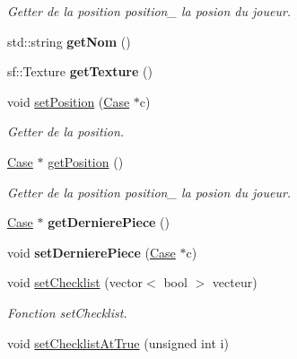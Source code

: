 \begin{DoxyCompactItemize}
\begin{DoxyCompactList}\small\item\em \-Getter de la position  position\-\_\- la posion du joueur. \end{DoxyCompactList}\item 
\hypertarget{classJoueur_a5ba8036208a35efd6bf37a86b36063b0}{std\-::string {\bfseries get\-Nom} ()}\label{classJoueur_a5ba8036208a35efd6bf37a86b36063b0}

\item 
\hypertarget{classJoueur_a04ffca29cd433b795e248eae8b04d2c1}{sf\-::\-Texture {\bfseries get\-Texture} ()}\label{classJoueur_a04ffca29cd433b795e248eae8b04d2c1}

\item 
void \hyperlink{classJoueur_aff78215b191d488c6555d100060fc2d6}{set\-Position} (\hyperlink{classCase}{\-Case} $\ast$c)
\begin{DoxyCompactList}\small\item\em \-Getter de la position. \end{DoxyCompactList}\item 
\hypertarget{classJoueur_a528cac966c6cfeab47e666ce3b2735c2}{\hyperlink{classCase}{\-Case} $\ast$ \hyperlink{classJoueur_a528cac966c6cfeab47e666ce3b2735c2}{get\-Position} ()}\label{classJoueur_a528cac966c6cfeab47e666ce3b2735c2}

\begin{DoxyCompactList}\small\item\em \-Getter de la position  position\-\_\- la posion du joueur. \end{DoxyCompactList}\item 
\hypertarget{classJoueur_a32909e93ab648b236fd670b8a24c5fb6}{\hyperlink{classCase}{\-Case} $\ast$ {\bfseries get\-Derniere\-Piece} ()}\label{classJoueur_a32909e93ab648b236fd670b8a24c5fb6}

\item 
\hypertarget{classJoueur_ace4248a785b7be8e12bcaaf84e3a41b5}{void {\bfseries set\-Derniere\-Piece} (\hyperlink{classCase}{\-Case} $\ast$c)}\label{classJoueur_ace4248a785b7be8e12bcaaf84e3a41b5}

\item 
\hypertarget{classJoueur_a5d32e5ba9665404f3b30fa5f548aaf43}{void \hyperlink{classJoueur_a5d32e5ba9665404f3b30fa5f548aaf43}{set\-Checklist} (vector$<$ bool $>$ vecteur)}\label{classJoueur_a5d32e5ba9665404f3b30fa5f548aaf43}

\begin{DoxyCompactList}\small\item\em \-Fonction set\-Checklist. \end{DoxyCompactList}\item 
\hypertarget{classJoueur_a8a94eef8959d5d7f7495429ceaf68124}{void \hyperlink{classJoueur_a8a94eef8959d5d7f7495429ceaf68124}{set\-Checklist\-At\-True} (unsigned int i)}\label{classJoueur_a8a94eef8959d5d7f7495429ceaf68124}


\end{DoxyCompactItemize}
